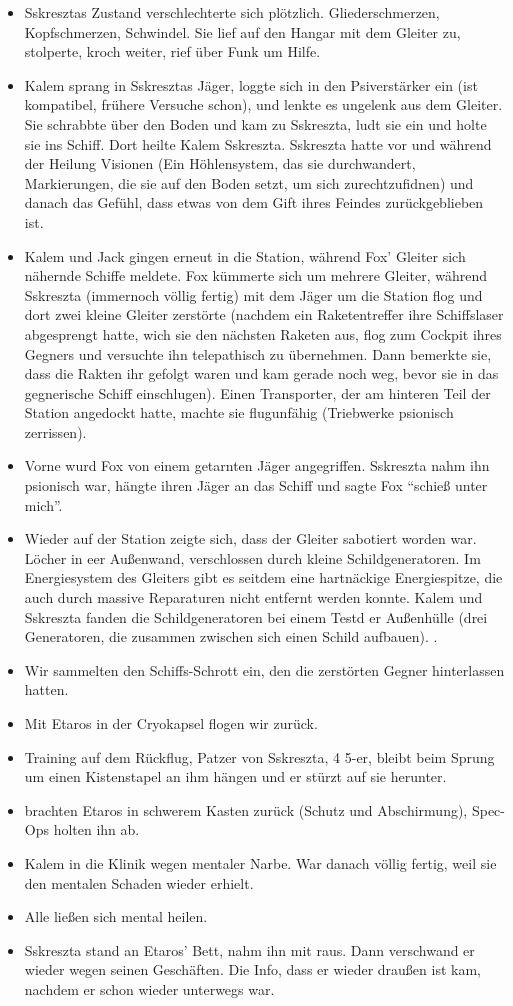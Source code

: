 \documentclass[11pt]{article}
\begin{document}
\begin{itemize}
\item
  Sskresztas Zustand verschlechterte sich plötzlich. Gliederschmerzen,
  Kopfschmerzen, Schwindel. Sie lief auf den Hangar mit dem Gleiter zu,
  stolperte, kroch weiter, rief über Funk um Hilfe.
\item
  Kalem sprang in Sskresztas Jäger, loggte sich in den Psiverstärker ein
  (ist kompatibel, frühere Versuche schon), und lenkte es ungelenk aus
  dem Gleiter. Sie schrabbte über den Boden und kam zu Sskreszta, ludt
  sie ein und holte sie ins Schiff. Dort heilte Kalem Sskreszta.
  Sskreszta hatte vor und während der Heilung Visionen (Ein
  Höhlensystem, das sie durchwandert, Markierungen, die sie auf den
  Boden setzt, um sich zurechtzufidnen) und danach das Gefühl, dass
  etwas von dem Gift ihres Feindes zurückgeblieben ist.
\item
  Kalem und Jack gingen erneut in die Station, während Fox' Gleiter sich
  nähernde Schiffe meldete. Fox kümmerte sich um mehrere Gleiter,
  während Sskreszta (immernoch völlig fertig) mit dem Jäger um die
  Station flog und dort zwei kleine Gleiter zerstörte (nachdem ein
  Raketentreffer ihre Schiffslaser abgesprengt hatte, wich sie den
  nächsten Raketen aus, flog zum Cockpit ihres Gegners und versuchte ihn
  telepathisch zu übernehmen. Dann bemerkte sie, dass die Rakten ihr
  gefolgt waren und kam gerade noch weg, bevor sie in das gegnerische
  Schiff einschlugen). Einen Transporter, der am hinteren Teil der
  Station angedockt hatte, machte sie flugunfähig (Triebwerke psionisch
  zerrissen).
\item
  Vorne wurd Fox von einem getarnten Jäger angegriffen. Sskreszta nahm
  ihn psionisch war, hängte ihren Jäger an das Schiff und sagte Fox
  ``schieß unter mich''.
\item
  Wieder auf der Station zeigte sich, dass der Gleiter sabotiert worden
  war. Löcher in eer Außenwand, verschlossen durch kleine
  Schildgeneratoren. Im Energiesystem des Gleiters gibt es seitdem eine
  hartnäckige Energiespitze, die auch durch massive Reparaturen nicht
  entfernt werden konnte. Kalem und Sskreszta fanden die
  Schildgeneratoren bei einem Testd er Außenhülle (drei Generatoren, die
  zusammen zwischen sich einen Schild aufbauen). .
\item
  Wir sammelten den Schiffs-Schrott ein, den die zerstörten Gegner
  hinterlassen hatten.
\item
  Mit Etaros in der Cryokapsel flogen wir zurück.
\item
  Training auf dem Rückflug, Patzer von Sskreszta, 4 5-er, bleibt beim
  Sprung um einen Kistenstapel an ihm hängen und er stürzt auf sie
  herunter.
\item
  brachten Etaros in schwerem Kasten zurück (Schutz und Abschirmung),
  Spec-Ops holten ihn ab.
\item
  Kalem in die Klinik wegen mentaler Narbe. War danach völlig fertig,
  weil sie den mentalen Schaden wieder erhielt.
\item
  Alle ließen sich mental heilen.
\item
  Sskreszta stand an Etaros' Bett, nahm ihn mit raus. Dann verschwand er
  wieder wegen seinen Geschäften. Die Info, dass er wieder draußen ist
  kam, nachdem er schon wieder unterwegs war.
\end{itemize}
\end{document}
